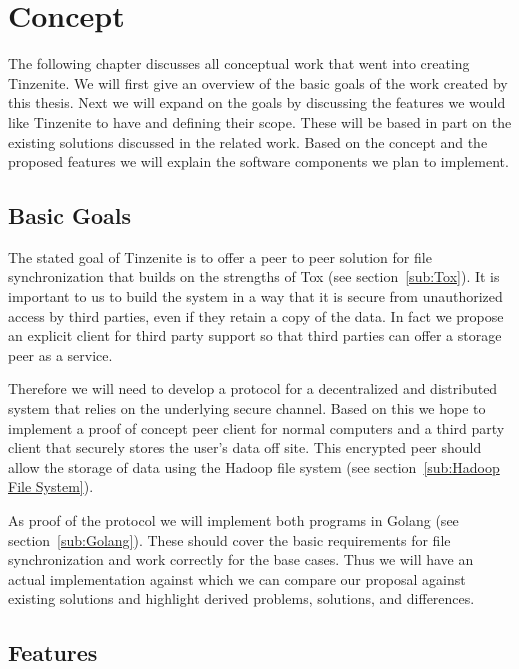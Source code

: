 \chapter{Concept}
\label{chap:concept}

The following chapter discusses all conceptual work that went into creating Tinzenite.
We will first give an overview of the basic goals of the work created by this thesis.
Next we will expand on the goals by discussing the features we would like Tinzenite to have and defining their scope.
These will be based in part on the existing solutions discussed in the related work.
Based on the concept and the proposed features we will explain the software components we plan to implement.

\section{Basic Goals}
\label{sec:Basic Goals}

The stated goal of Tinzenite is to offer a peer to peer solution for file synchronization that builds on the strengths of Tox (see section~\ref{sub:Tox}).
It is important to us to build the system in a way that it is secure from unauthorized access by third parties, even if they retain a copy of the data.
In fact we propose an explicit client for third party support so that third parties can offer a storage peer as a service.

Therefore we will need to develop a protocol for a decentralized and distributed system that relies on the underlying secure channel.
Based on this we hope to implement a proof of concept peer client for normal computers and a third party client that securely stores the user's data off site.
This encrypted peer should allow the storage of data using the Hadoop file system (see section~\ref{sub:Hadoop File System}).

As proof of the protocol we will implement both programs in Golang (see section~\ref{sub:Golang}).
These should cover the basic requirements for file synchronization and work correctly for the base cases.
Thus we will have an actual implementation against which we can compare our proposal against existing solutions and highlight derived problems, solutions, and differences.

\section{Features}
\label{sec:Features}

